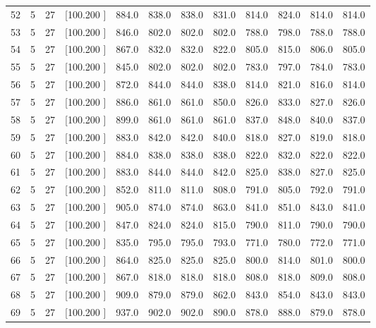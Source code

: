 \documentclass[12pt,a4paper]{article}
\begin{document}
\begin{center}
{\begin{tabular}{r r r r r r r r r r r r}
  52&  5& 27&[100.200   ]&   884.0&   838.0&   838.0&   831.0&   814.0&   824.0&   814.0&   814.0\\[-0.02in]
  53&  5& 27&[100.200   ]&   846.0&   802.0&   802.0&   802.0&   788.0&   798.0&   788.0&   788.0\\[-0.02in]
  54&  5& 27&[100.200   ]&   867.0&   832.0&   832.0&   822.0&   805.0&   815.0&   806.0&   805.0\\[-0.02in]
  55&  5& 27&[100.200   ]&   845.0&   802.0&   802.0&   802.0&   783.0&   797.0&   784.0&   783.0\\[-0.02in]
  56&  5& 27&[100.200   ]&   872.0&   844.0&   844.0&   838.0&   814.0&   821.0&   816.0&   814.0\\[-0.02in]
  57&  5& 27&[100.200   ]&   886.0&   861.0&   861.0&   850.0&   826.0&   833.0&   827.0&   826.0\\[-0.02in]
  58&  5& 27&[100.200   ]&   899.0&   861.0&   861.0&   861.0&   837.0&   848.0&   840.0&   837.0\\[-0.02in]
  59&  5& 27&[100.200   ]&   883.0&   842.0&   842.0&   840.0&   818.0&   827.0&   819.0&   818.0\\[-0.02in]
  60&  5& 27&[100.200   ]&   884.0&   838.0&   838.0&   838.0&   822.0&   832.0&   822.0&   822.0\\[-0.02in]
  61&  5& 27&[100.200   ]&   883.0&   844.0&   844.0&   842.0&   825.0&   838.0&   827.0&   825.0\\[-0.02in]
  62&  5& 27&[100.200   ]&   852.0&   811.0&   811.0&   808.0&   791.0&   805.0&   792.0&   791.0\\[-0.02in]
  63&  5& 27&[100.200   ]&   905.0&   874.0&   874.0&   863.0&   841.0&   851.0&   843.0&   841.0\\[-0.02in]
  64&  5& 27&[100.200   ]&   847.0&   824.0&   824.0&   815.0&   790.0&   811.0&   790.0&   790.0\\[-0.02in]
  65&  5& 27&[100.200   ]&   835.0&   795.0&   795.0&   793.0&   771.0&   780.0&   772.0&   771.0\\[-0.02in]
  66&  5& 27&[100.200   ]&   864.0&   825.0&   825.0&   825.0&   800.0&   814.0&   801.0&   800.0\\[-0.02in]
  67&  5& 27&[100.200   ]&   867.0&   818.0&   818.0&   818.0&   808.0&   818.0&   809.0&   808.0\\[-0.02in]
  68&  5& 27&[100.200   ]&   909.0&   879.0&   879.0&   862.0&   843.0&   854.0&   843.0&   843.0\\[-0.02in]
  69&  5& 27&[100.200   ]&   937.0&   902.0&   902.0&   890.0&   878.0&   888.0&   879.0&   878.0\\[-0.02in]

\end{tabular}}
\end{center}
\end{document}
